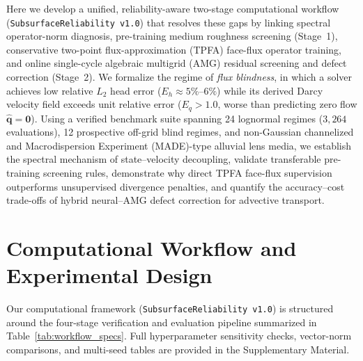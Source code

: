 \documentclass[preprint,12pt,authoryear]{elsarticle}
\begin{document}
Here we develop a unified, reliability-aware two-stage computational workflow (\texttt{SubsurfaceReliability v1.0}) that resolves these gaps by linking spectral operator-norm diagnosis, pre-training medium roughness screening (Stage~1), conservative two-point flux-approximation (TPFA) face-flux operator training, and online single-cycle algebraic multigrid (AMG) residual screening and defect correction (Stage~2). We formalize the regime of \textit{flux blindness}, in which a solver achieves low relative $L_2$ head error ($E_h \approx 5\%$--$6\%$) while its derived Darcy velocity field exceeds unit relative error ($E_q > 1.0$, worse than predicting zero flow $\hat{\mathbf{q}} = \mathbf{0}$). Using a verified benchmark suite spanning 24 lognormal regimes ($3{,}264$ evaluations), 12 prospective off-grid blind regimes, and non-Gaussian channelized and Macrodispersion Experiment (MADE)-type alluvial lens media, we establish the spectral mechanism of state--velocity decoupling, validate transferable pre-training screening rules, demonstrate why direct TPFA face-flux supervision outperforms unsupervised divergence penalties, and quantify the accuracy--cost trade-offs of hybrid neural--AMG defect correction for advective transport.

\section{Computational Workflow and Experimental Design}
\label{sec:methods}

Our computational framework (\texttt{SubsurfaceReliability v1.0}) is structured around the four-stage verification and evaluation pipeline summarized in Table~\ref{tab:workflow_specs}. Full hyperparameter sensitivity checks, vector-norm comparisons, and multi-seed tables are provided in the Supplementary Material.
\end{document}
